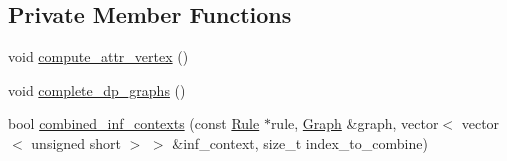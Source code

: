 \subsection*{Private Member Functions}
\begin{CompactItemize}
\item 
void \hyperlink{classgenevalmag_1_1Builder__graphs_a59af10c4b00c93e0bd95c1a17166ea5}{compute\_\-attr\_\-vertex} ()
\item 
void \hyperlink{classgenevalmag_1_1Builder__graphs_6517d3d908a698316f76ac647b587982}{complete\_\-dp\_\-graphs} ()
\item 
bool \hyperlink{classgenevalmag_1_1Builder__graphs_e8827b596ff808331a1d6e8005e7f71b}{combined\_\-inf\_\-contexts} (const \hyperlink{classgenevalmag_1_1Rule}{Rule} $\ast$rule, \hyperlink{namespacegenevalmag_4a96de9ebfc7d48233406ab9cad55cb5}{Graph} \&graph, vector$<$ vector$<$ unsigned short $>$ $>$ \&inf\_\-context, size\_\-t index\_\-to\_\-combine)
\end{CompactItemize}
